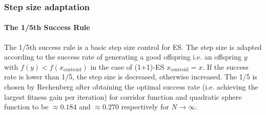 



\subsubsection{Step size adaptation}\label{sssec:step_size_adaptation}\hfill
\paragraph{The 1/5th Success Rule} 
The 1/5th success rule is a basic step size control for ES. The step size is adapted according to the success rate of generating a good offspring i.e. an offspring $y$ with $f(y)<f(x_{\text{centroid}})$ in the case of (1+1)-ES $x_{\text{centroid}}=x$. If the success rate is lower than 1/5, the step size is decreased, otherwise increased. The 1/5 is chosen by Rechenberg \cite{Rechenberg1973} after obtaining the optimal success rate (i.e. achieving the largest fitness gain per iteration) for corridor function and quadratic sphere function to be $\approx 0.184$ and $\approx 0.270$ respectively for $N \rightarrow \infty$.  
